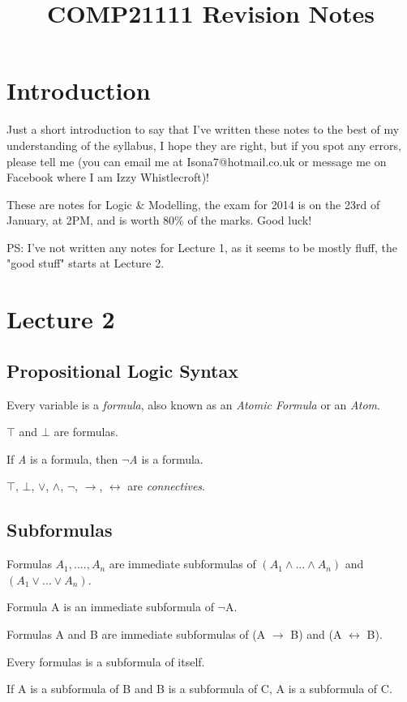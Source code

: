 \documentclass[11pt,a4paper]{article}
\begin{document}
\title{COMP21111 Revision Notes}
\maketitle
\tableofcontents
\newpage
\setlength{\parindent}{0pt}
\section{Introduction}
Just a short introduction to say that I've written these notes to the best of my understanding of the syllabus, I hope they are right, but if you spot any errors, please tell me (you can email me at Isona7@hotmail.co.uk or message me on Facebook where I am Izzy Whistlecroft)!

These are notes for Logic \& Modelling, the exam for 2014 is on the 23rd of January, at 2PM, and is worth 80\% of the marks. Good luck!

PS: I've not written any notes for Lecture 1, as it seems to be mostly fluff, the "good stuff" starts at Lecture 2.
\section{Lecture 2}
\subsection{Propositional Logic Syntax}
Every variable is a \emph{formula}, also known as an \emph{Atomic Formula} or an \emph{Atom}.

$\top$  and  $\bot$ are formulas.

If \emph{A} is a formula, then \emph{$\neg$A} is a formula.

$\top$, $\bot$, $\vee$, $\wedge$, $\neg$, $\rightarrow$, $\leftrightarrow$ are \emph{connectives}.

\subsection{Subformulas}
Formulas $A_1, .... ,A_n$ are immediate subformulas of $(A_1 \wedge ... \wedge A_n)$ and $(A_1 \vee ... \vee A_n)$.

Formula A is an immediate subformula of $\neg$A.

Formulas A and B are immediate subformulas of (A $\rightarrow$ B) and (A $\leftrightarrow$ B).

Every formulas is a subformula of itself.

If A is a subformula of B and B is a subformula of C, A is a subformula of C.
\end{document}
